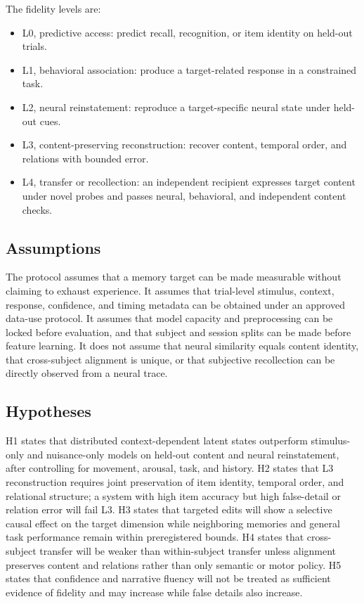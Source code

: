 \documentclass[conference]{IEEEtran}
\begin{document}
The fidelity levels are:
\begin{itemize}
\item L0, predictive access: predict recall, recognition, or item identity on held-out trials.
\item L1, behavioral association: produce a target-related response in a constrained task.
\item L2, neural reinstatement: reproduce a target-specific neural state under held-out cues.
\item L3, content-preserving reconstruction: recover content, temporal order, and relations with bounded error.
\item L4, transfer or recollection: an independent recipient expresses target content under novel probes and passes neural, behavioral, and independent content checks.
\end{itemize}

\subsection{Assumptions}
The protocol assumes that a memory target can be made measurable without claiming to exhaust experience. It assumes that trial-level stimulus, context, response, confidence, and timing metadata can be obtained under an approved data-use protocol. It assumes that model capacity and preprocessing can be locked before evaluation, and that subject and session splits can be made before feature learning. It does not assume that neural similarity equals content identity, that cross-subject alignment is unique, or that subjective recollection can be directly observed from a neural trace.

\subsection{Hypotheses}
H1 states that distributed context-dependent latent states outperform stimulus-only and nuisance-only models on held-out content and neural reinstatement, after controlling for movement, arousal, task, and history. H2 states that L3 reconstruction requires joint preservation of item identity, temporal order, and relational structure; a system with high item accuracy but high false-detail or relation error will fail L3. H3 states that targeted edits will show a selective causal effect on the target dimension while neighboring memories and general task performance remain within preregistered bounds. H4 states that cross-subject transfer will be weaker than within-subject transfer unless alignment preserves content and relations rather than only semantic or motor policy. H5 states that confidence and narrative fluency will not be treated as sufficient evidence of fidelity and may increase while false details also increase.
\end{document}
